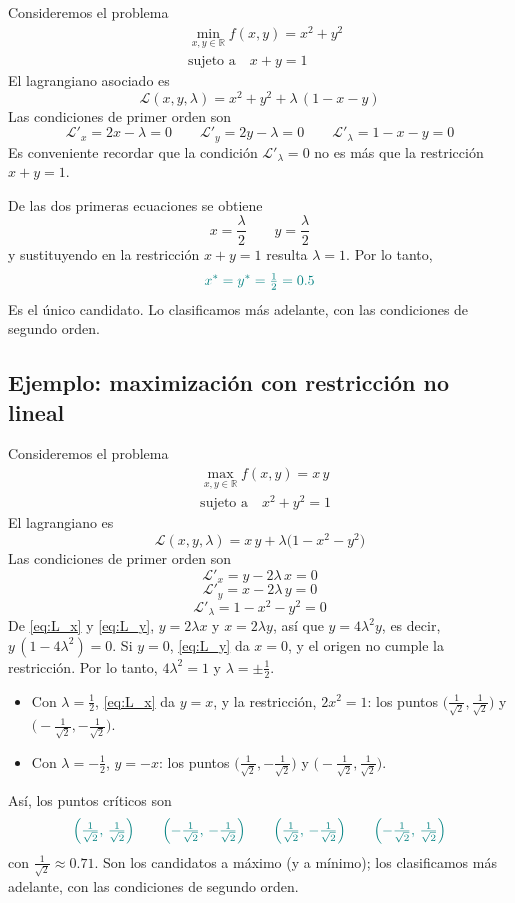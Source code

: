 \documentclass{article}
\newcommand{\R}{\ensuremath{\mathbb{R}}}
\begin{document}
Consideremos el problema
\[
\begin{aligned}
&\min_{x,y\in\R} f(x,y)=x^2+y^2\\
&\text{sujeto a}\quad x+y=1
\end{aligned}
\]
El lagrangiano asociado es
\[
\mathcal{L}(x,y,\lambda)=x^2+y^2+\lambda\,(1-x-y)
\]
Las condiciones de primer orden son
\[
\mathcal{L}'_x=2x-\lambda=0
\qquad
\mathcal{L}'_y=2y-\lambda=0
\qquad
\mathcal{L}'_\lambda=1-x-y=0
\]
Es conveniente recordar que la condición \(\mathcal{L}'_\lambda=0\) no es más que la restricción \(x+y=1\).

De las dos primeras ecuaciones se obtiene
\[
x=\frac{\lambda}{2}
\qquad
y=\frac{\lambda}{2}
\]
y sustituyendo en la restricción \(x+y=1\) resulta \(\lambda=1\). Por lo tanto,
\[
{\color{teal}x^*=y^*=\tfrac12=0.5}
\]
Es el único candidato. Lo clasificamos más adelante, con las condiciones de segundo orden.

\subsection*{Ejemplo: maximización con restricción no lineal}

Consideremos el problema
\[
\begin{aligned}
&\max_{x,y\in\R} f(x,y)=x\,y\\
&\text{sujeto a}\quad x^2+y^2=1
\end{aligned}
\]
El lagrangiano es
\[
\mathcal{L}(x,y,\lambda)=x\,y+\lambda\bigl(1-x^2-y^2\bigr)
\]
Las condiciones de primer orden son
\begin{equation}
\mathcal{L}'_x=y-2\lambda\,x=0
\label{eq:L_x}
\end{equation}
\begin{equation}
\mathcal{L}'_y=x-2\lambda\,y=0
\label{eq:L_y}
\end{equation}
\begin{equation}
\mathcal{L}'_\lambda=1-x^2-y^2=0
\label{eq:L_lambda}
\end{equation}
De \eqref{eq:L_x} y \eqref{eq:L_y}, \(y=2\lambda x\) y \(x=2\lambda y\), así que \(y=4\lambda^2y\), es decir, \(y\,(1-4\lambda^2)=0\). Si \(y=0\), \eqref{eq:L_y} da \(x=0\), y el origen no cumple la restricción. Por lo tanto, \(4\lambda^2=1\) y \(\lambda=\pm\tfrac12\).
\begin{itemize}
  \item Con \(\lambda=\tfrac12\), \eqref{eq:L_x} da \(y=x\), y la restricción, \(2x^2=1\): los puntos \(\bigl(\tfrac1{\sqrt2},\tfrac1{\sqrt2}\bigr)\) y \(\bigl(-\tfrac1{\sqrt2},-\tfrac1{\sqrt2}\bigr)\).
  \item Con \(\lambda=-\tfrac12\), \(y=-x\): los puntos \(\bigl(\tfrac1{\sqrt2},-\tfrac1{\sqrt2}\bigr)\) y \(\bigl(-\tfrac1{\sqrt2},\tfrac1{\sqrt2}\bigr)\).
\end{itemize}
Así, los puntos críticos son
\[\color{teal}
\Bigl(\tfrac1{\sqrt2},\,\tfrac1{\sqrt2}\Bigr)\qquad
\Bigl(-\tfrac1{\sqrt2},\,-\tfrac1{\sqrt2}\Bigr)\qquad
\Bigl(\tfrac1{\sqrt2},\,-\tfrac1{\sqrt2}\Bigr)\qquad
\Bigl(-\tfrac1{\sqrt2},\,\tfrac1{\sqrt2}\Bigr)
\]
con \(\tfrac1{\sqrt2}\approx0.71\). Son los candidatos a máximo (y a mínimo); los clasificamos más adelante, con las condiciones de segundo orden.
\end{document}
